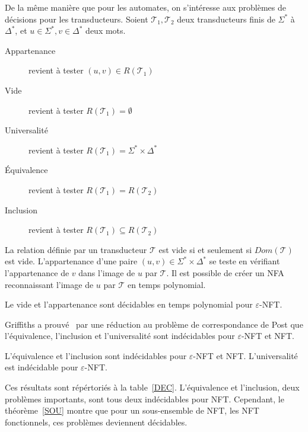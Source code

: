     De la même manière que pour les automates, on s'intéresse aux problèmes de décisions pour les transducteurs.
    Soient $\mathscr{T}_1, \mathscr{T}_2$ deux transducteurs finis de $\Sigma^*$ à $\Delta^*$, et $u \in \Sigma^*,v \in \Delta^*$ deux mots.
    	
    \begin{description}
    	\item[Appartenance] revient à tester $(u,v) \in R(\mathscr{T}_1)$
    	\item[Vide] revient à tester $R(\mathscr{T}_1) = \emptyset$
    	\item[Universalité] revient à tester $R(\mathscr{T}_1) = \Sigma^* \times \Delta^*$
    	\item[\'{E}quivalence] revient à tester $R(\mathscr{T}_1) = R(\mathscr{T}_2)$
    	\item[Inclusion] revient à tester $R(\mathscr{T}_1) \subseteq R(\mathscr{T}_2)$
    \end{description}
    
    La relation définie par un transducteur $\mathscr{T}$ est vide si et seulement si $Dom(\mathscr{T})$ est vide. L'appartenance d'une paire $(u,v) \in \Sigma^* \times \Delta^*$ se teste en vérifiant l'appartenance de $v$ dans l'image de $u$ par $\mathscr{T}$. Il est possible de créer un NFA reconnaissant l'image de $u$ par $\mathscr{T}$ en temps polynomial. \\
    
    \begin{proposition}
        Le vide et l'appartenance sont décidables en temps polynomial pour $\varepsilon$-NFT.
    \end{proposition}
    
    Griffiths a prouvé~\cite{Gri68} par une réduction au problème de correspondance de Post que l'équivalence, l'inclusion et l'universalité sont indécidables pour $\varepsilon$-NFT et NFT.  \\
    
    \begin{theorem}
        L'équivalence et l'inclusion sont indécidables pour $\varepsilon$-NFT et NFT. L'universalité est indécidable pour $\varepsilon$-NFT.
    \end{theorem}
    
    Ces résultats sont répértoriés à la table~\ref{DEC}. L'équivalence et l'inclusion, deux problèmes importants, sont tous deux indécidables pour NFT. Cependant, le théorème~\ref{SOU} montre que pour un sous-ensemble de NFT, les NFT fonctionnels, ces problèmes deviennent décidables. \\
    
